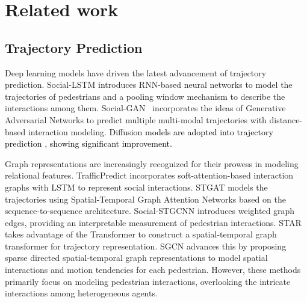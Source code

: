 \section{Related work}
\subsection{Trajectory Prediction}
\label{sec:future}

Deep learning models have driven the latest advancement of trajectory prediction. 
Social-LSTM \cite{Alexandre2016lstm} introduces RNN-based neural networks \cite{HochSchm1997lstm} to model the trajectories of pedestrians and a pooling window mechanism to describe the interactions among them. Social-GAN~\cite{gupta2018socialgan} incorporates the ideas of Generative Adversarial Networks \cite{goodfellow2014GAN} to predict multiple multi-modal trajectories with distance-based interaction modeling. \textcolor{black}{Diffusion models \cite{chang2023design} are adopted into trajectory prediction \cite{gu2022stochastic, mao2023leapfrog}, showing significant improvement.}

Graph representations are increasingly recognized for their prowess in modeling relational features. TrafficPredict \cite{ma2019trafficPredict} incorporates soft-attention-based interaction graphs with LSTM to represent social interactions. STGAT \cite{huang2019stgat} models the trajectories using Spatial-Temporal Graph Attention Networks based on the sequence-to-sequence architecture. Social-STGCNN \cite{Mohamed2020socialstgcnn} introduces weighted graph edges, providing an interpretable measurement of pedestrian interactions. STAR \cite{cunjun2020star} takes advantage of the Transformer \cite{vaswani2017transformer} to construct a spatial-temporal graph transformer for trajectory representation. SGCN \cite{shi2021sgcn} advances this by proposing sparse directed spatial-temporal graph representations to model spatial interactions and motion tendencies for each pedestrian. However, these methods primarily focus on modeling pedestrian interactions, overlooking the intricate interactions among heterogeneous agents.

